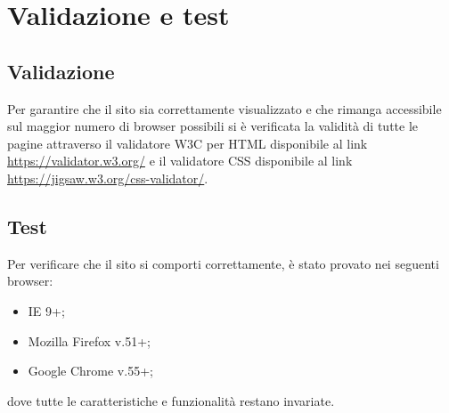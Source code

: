 \section{Validazione e test}
\subsection{Validazione}
Per garantire che il sito sia correttamente visualizzato e che rimanga accessibile sul maggior numero di browser possibili si è verificata la validità di tutte le pagine attraverso il validatore W3C per HTML disponibile al link \url{https://validator.w3.org/} e il validatore CSS disponibile al link \url{https://jigsaw.w3.org/css-validator/}.

\subsection{Test}
Per verificare che il sito si comporti correttamente, è stato provato nei seguenti browser:
\begin{itemize}
	\item IE 9+;
	\item Mozilla Firefox v.51+;
	\item Google Chrome v.55+;
\end{itemize}
dove tutte le caratteristiche e funzionalità restano invariate.

\newpage